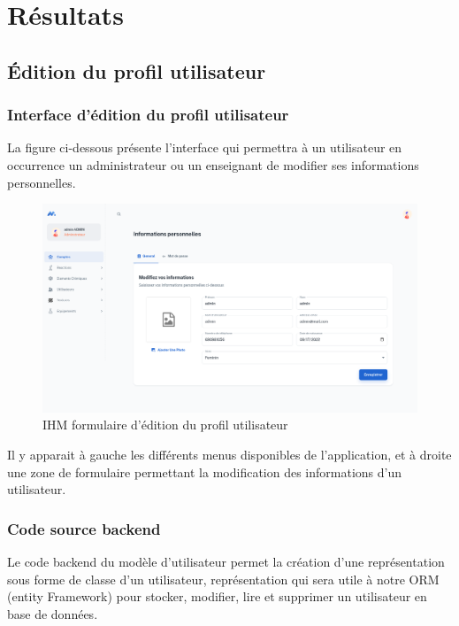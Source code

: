 \newpage
\section{Résultats}

\subsection{Édition du profil utilisateur}

\subsubsection{Interface d'édition du profil utilisateur}

La figure ci-dessous présente l'interface qui permettra à un utilisateur en occurrence un administrateur ou un enseignant de modifier ses informations personnelles.

\begin{figure}[H]
	\centering
	\includegraphics[width=1\textwidth]{img/editpr}
	\caption{IHM formulaire d'édition du profil utilisateur}
	\label{fig:mesh1}
\end{figure}

Il y apparait à gauche les différents menus disponibles de l'application, et à droite une zone de formulaire permettant la modification des informations d'un utilisateur.

\subsubsection{Code source backend}

Le code backend du modèle d'utilisateur permet la création d'une représentation sous forme de classe d'un utilisateur, représentation qui sera utile à notre ORM (entity Framework) pour stocker, modifier, lire et supprimer un utilisateur en base de données.

